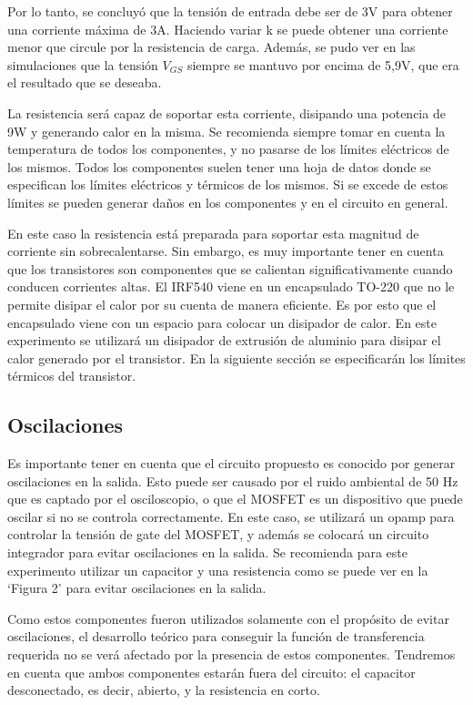 \documentclass[12pt,oneside,a4paper]{article}
\begin{document}
Por lo tanto, se concluyó que la tensión de entrada debe ser de 3V para obtener una corriente máxima de 3A. 
Haciendo variar k se puede obtener una corriente menor que circule por la resistencia de carga. Además, se
pudo ver en las simulaciones que la tensión $V_{GS}$ siempre se mantuvo por encima de 5,9V, que era 
el resultado que se deseaba.

La resistencia será capaz de soportar esta corriente, disipando una potencia de 9W y generando calor 
en la misma. Se recomienda siempre tomar en cuenta la temperatura de todos los componentes, y no 
pasarse de los límites eléctricos de los mismos. Todos los componentes suelen tener una hoja de datos 
donde se especifican los límites eléctricos y térmicos de los mismos. Si se excede de estos límites se pueden 
generar daños en los componentes y en el circuito en general. 

En este caso la resistencia está preparada para soportar esta magnitud de corriente sin sobrecalentarse. 
Sin embargo, es muy importante tener en cuenta que los transistores son componentes que se calientan 
significativamente cuando conducen corrientes altas. El IRF540 viene en un encapsulado TO-220 que no le 
permite disipar el calor por su cuenta de manera eficiente. Es por esto que el encapsulado viene con un 
espacio para colocar un disipador de calor. En este experimento se utilizará un disipador de extrusión 
de aluminio para disipar el calor generado por el transistor. En la siguiente sección se especificarán 
los límites térmicos del transistor.

\newpage
\subsection*{Oscilaciones} 
Es importante tener en cuenta que el circuito propuesto es conocido por generar 
oscilaciones en la salida. Esto puede ser causado por el ruido ambiental de 50 Hz que es captado por el 
osciloscopio, o que el MOSFET es un dispositivo que puede oscilar si no se
controla correctamente. En este caso, se utilizará un opamp para controlar la tensión de gate del MOSFET, 
y además se colocará un circuito integrador para evitar oscilaciones en la salida. Se recomienda para este 
experimento utilizar un capacitor y una resistencia como se puede ver en la \enquote*{Figura 2} para 
evitar oscilaciones en la salida.

Como estos componentes fueron utilizados solamente con el propósito de evitar oscilaciones, el 
desarrollo teórico para conseguir la función de transferencia requerida no se verá afectado por la 
presencia de estos componentes. Tendremos en cuenta que ambos componentes estarán fuera del circuito:
el capacitor desconectado, es decir, abierto, y la resistencia en corto.
\end{document}
